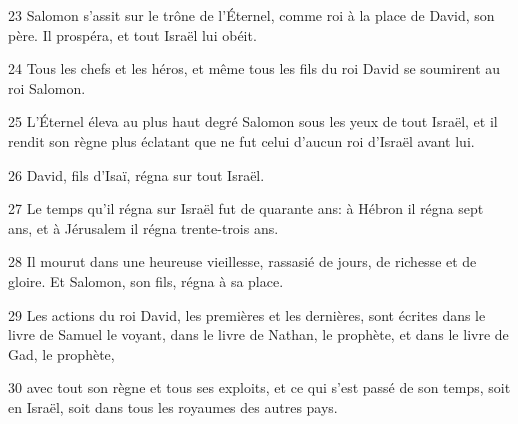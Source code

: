 \par 23 Salomon s'assit sur le trône de l'Éternel, comme roi à la place de David, son père. Il prospéra, et tout Israël lui obéit.
\par 24 Tous les chefs et les héros, et même tous les fils du roi David se soumirent au roi Salomon.
\par 25 L'Éternel éleva au plus haut degré Salomon sous les yeux de tout Israël, et il rendit son règne plus éclatant que ne fut celui d'aucun roi d'Israël avant lui.
\par 26 David, fils d'Isaï, régna sur tout Israël.
\par 27 Le temps qu'il régna sur Israël fut de quarante ans: à Hébron il régna sept ans, et à Jérusalem il régna trente-trois ans.
\par 28 Il mourut dans une heureuse vieillesse, rassasié de jours, de richesse et de gloire. Et Salomon, son fils, régna à sa place.
\par 29 Les actions du roi David, les premières et les dernières, sont écrites dans le livre de Samuel le voyant, dans le livre de Nathan, le prophète, et dans le livre de Gad, le prophète,
\par 30 avec tout son règne et tous ses exploits, et ce qui s'est passé de son temps, soit en Israël, soit dans tous les royaumes des autres pays.


